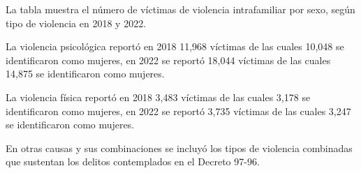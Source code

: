 La tabla muestra el número de víctimas de violencia intrafamiliar por sexo, según tipo de violencia en 2018 y 2022. 

La violencia psicológica reportó en 2018 11,968 víctimas de las cuales 10,048 se identificaron como mujeres, en 2022 se reportó 18,044 víctimas de las cuales 14,875 se identificaron como mujeres. 

La violencia física reportó en 2018 3,483 víctimas de las cuales 3,178 se identificaron como mujeres, en 2022 se reportó 3,735 víctimas de las cuales 3,247 se identificaron como mujeres. 

En otras causas y sus combinaciones se incluyó los tipos de violencia combinadas que sustentan los delitos contemplados en el Decreto 97-96.